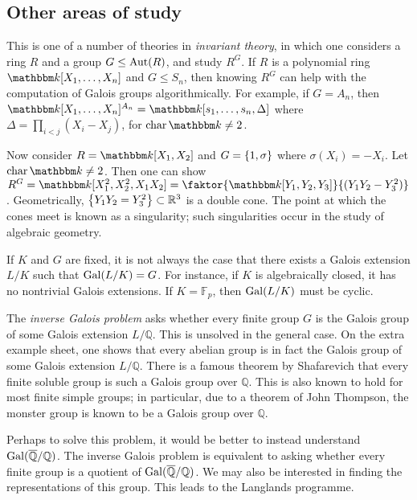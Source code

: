 \subsection{Other areas of study}
This is one of a number of theories in \emph{invariant theory}, in which one considers a ring \( R \) and a group \( G \leq \operatorname{Aut}(R) \), and study \( R^G \).
If \( R \) is a polynomial ring \( \mathbbm k[X_1, \dots, X_n] \) and \( G \leq S_n \), then knowing \( R^G \) can help with the computation of Galois groups algorithmically.
For example, if \( G = A_n \), then \( \mathbbm k[X_1, \dots, X_n]^{A_n} = \mathbbm k[s_1, \dots, s_n, \Delta] \) where \( \Delta = \prod_{i < j} (X_i - X_j) \), for \( \fchar \mathbbm k \neq 2 \).

Now consider \( R = \mathbbm k[X_1, X_2] \) and \( G = \qty{1, \sigma} \) where \( \sigma(X_i) = -X_i \).
Let \( \fchar \mathbbm k \neq 2 \).
Then one can show \( R^G = \mathbbm k[X_1^2, X_2^2, X_1 X_2] = \faktor{\mathbbm k[Y_1, Y_2, Y_3]}{(Y_1 Y_2 - Y_3^2)} \).
Geometrically, \( \qty{Y_1 Y_2 = Y_3^2} \subset \mathbb R^3 \) is a double cone.
The point at which the cones meet is known as a singularity; such singularities occur in the study of algebraic geometry.

If \( K \) and \( G \) are fixed, it is not always the case that there exists a Galois extension \( L / K \) such that \( \operatorname{Gal}(L/K) = G \).
For instance, if \( K \) is algebraically closed, it has no nontrivial Galois extensions.
If \( K = \mathbb F_p \), then \( \operatorname{Gal}(L/K) \) must be cyclic.

The \emph{inverse Galois problem} asks whether every finite group \( G \) is the Galois group of some Galois extension \( L / \mathbb Q \).
This is unsolved in the general case.
On the extra example sheet, one shows that every abelian group is in fact the Galois group of some Galois extension \( L / \mathbb Q \).
There is a famous theorem by Shafarevich that every finite soluble group is such a Galois group over \( \mathbb Q \).
This is also known to hold for most finite simple groups; in particular, due to a theorem of John Thompson, the monster group is known to be a Galois group over \( \mathbb Q \).

Perhaps to solve this problem, it would be better to instead understand \( \operatorname{Gal}(\overline{\mathbb Q}/\mathbb Q) \).
The inverse Galois problem is equivalent to asking whether every finite group is a quotient of \( \operatorname{Gal}(\overline{\mathbb Q}/\mathbb Q) \).
We may also be interested in finding the representations of this group.
This leads to the Langlands programme.
